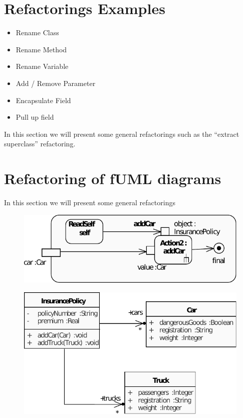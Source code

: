 \documentclass{llncs}
\begin{document}
\section{Refactorings Examples}
\begin{itemize}
\item Rename Class
\item Rename Method
\item Rename Variable
\item Add / Remove Parameter
\item Encapsulate Field
\item Pull up field
\end{itemize}

In this section we will present some general refactorings such as the ``extract superclass'' refactoring.

\section{Refactoring of fUML diagrams}
In this section we will present some general refactorings

\begin{figure}
 \includegraphics{images/addCar-activity_diagram}
\end{figure}

\begin{figure}
 \includegraphics{images/addCar-class_diagram.pdf}
\end{figure}
\end{document}
